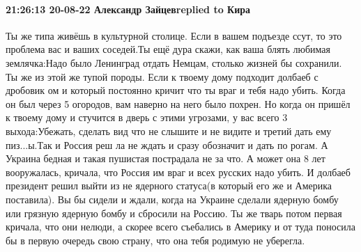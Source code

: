  
 
 
 
 

\paragraph{21:26:13 20-08-22 Александр Зайцевreplied to Кира}

Ты же типа живёшь в культурной столице. Если в вашем подъезде ссут, то это
проблема вас и ваших соседей.Ты ещё дура скажи, как ваша блять любимая
землячка:Надо было Ленинград отдать Немцам, столько жизней бы сохранили. Ты же
из этой же тупой породы. Если к твоему дому подходит долбаеб с дробовик ом и
который постоянно кричит что ты враг и тебя надо убить. Когда он был через 5
огородов, вам наверно на него было похрен. Но когда он пришёл к твоему дому и
стучится в дверь с этими угрозами, у вас всего 3 выхода:Убежать, сделать вид
что не слышите и не видите и третий дать ему пиз...ы.Так и Россия реш ла не
ждать и сразу обозначит и дать по рогам. А Украина бедная и такая пушистая
пострадала не за что. А может она 8 лет вооружалась, кричала, что Россия им
враг и всех русских надо убить. И долбаеб президент решил выйти из не ядерного
статуса(в который его же и Америка поставила). Вы бы сидели и ждали, когда на
Украине сделали ядерную бомбу или грязную ядерную бомбу и сбросили на Россию.
Ты же тварь потом первая кричала, что они нелюди, а скорее всего съебались в
Америку и от туда поносила бы в первую очередь свою страну, что она тебя
родимую не уберегла.
